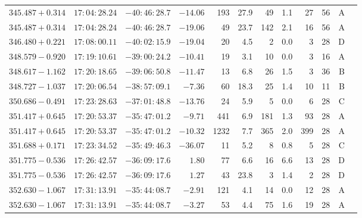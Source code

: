 {\begin{longtable}{c rrr rrrrr rr c}
    $345.487+0.314$     &   $17:04:28.24$     &   $-40:46:28.7$     &   $-14.06  $    &   193    &   27.9    &    49  &   1.1 &   27  &   56  &   A   \\
    $345.487+0.314$     &   $17:04:28.24$     &   $-40:46:28.7$     &   $-19.06  $    &   49     &   23.7    &    142 &   2.1 &   16  &   56  &   A   \\
    $346.480+0.221$     &   $17:08:00.11$     &   $-40:02:15.9$     &   $-19.04  $    &   20     &    4.5    &    2   &   0.0 &   3   &   28  &   D   \\
    $348.579-0.920$     &   $17:19:10.61$     &   $-39:00:24.2$     &   $-10.41  $    &   19     &    3.1    &    10  &   0.0 &   3   &   16  &   A   \\
    $348.617-1.162$     &   $17:20:18.65$     &   $-39:06:50.8$     &   $-11.47  $    &   13     &    6.8    &    26  &   1.5 &   3   &   36  &   B   \\
    $348.727-1.037$     &   $17:20:06.54$     &   $-38:57:09.1$     &   $-7.36   $    &   60     &   18.3    &    25  &   1.4 &   10  &   11  &   B   \\
    $350.686-0.491$     &   $17:23:28.63$     &   $-37:01:48.8$     &   $-13.76  $    &   24     &    5.9    &    5   &   0.0 &   6   &   28  &   C   \\
    $351.417+0.645$     &   $17:20:53.37$     &   $-35:47:01.2$     &   $-9.71   $    &   441    &    6.9    &    181 &   1.3 &   93  &   28  &   A   \\
    $351.417+0.645$     &   $17:20:53.37$     &   $-35:47:01.2$     &   $-10.32  $    &   1232   &    7.7    &    365 &   2.0 &   399 &   28  &   A   \\
    $351.688+0.171$     &   $17:23:34.52$     &   $-35:49:46.3$     &   $-36.07  $    &   11     &    5.2    &    8   &   0.8 &   5   &   28  &   C   \\
    $351.775-0.536$     &   $17:26:42.57$     &   $-36:09:17.6$     &   $1.80    $    &   77     &    6.6    &    16  &   6.6 &   13  &   28  &   D   \\
    $351.775-0.536$     &   $17:26:42.57$     &   $-36:09:17.6$     &   $1.27    $    &   43     &   23.8    &    3   &   1.4 &   2   &   28  &   D   \\
    $352.630-1.067$     &   $17:31:13.91$     &   $-35:44:08.7$     &   $-2.91   $    &   121    &    4.1    &    14  &   0.0 &   12  &   28  &   A   \\
    $352.630-1.067$     &   $17:31:13.91$     &   $-35:44:08.7$     &   $-3.27   $    &   53     &    4.4    &    75  &   1.6 &   19  &   28  &   A   \\

\end{longtable}}
